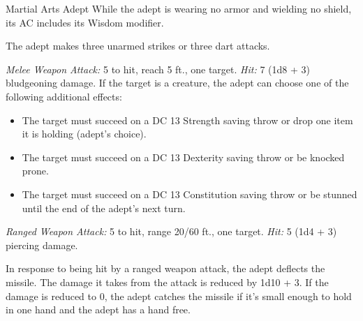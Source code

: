\documentclass[10pt,a4paper,twoside,bg=print,twocolumn,openany,nodeprecatedcode]{dndbook}
\begin{document}
\begin{DndMonster}[float=t]{Martial Arts Adept}
\DndMonsterBasics[
armor-class = {16},
hit-points = {\DndDice{11d8 + 11}},
speed = {40 ft.}
]
\DndMonsterAbilityScores[
 str = 11,
 dex = 17,
 con = 13,
 int = 11,
 wis = 16,
 cha = 10
]
\DndMonsterDetails[
skills = {Acrobatics +5, Insight +5, Stealth +5},
languages = {any one language (usually Common)},
challenge = 3,
]
While the adept is wearing no armor and wielding no shield, its AC includes its Wisdom modifier.

The adept makes three unarmed strikes or three dart attacks.

\textsl{Melee Weapon Attack:} 5 to hit, reach 5 ft., one target. \textsl{Hit:} 7 (1d8 + 3) bludgeoning damage. If the target is a creature, the adept can choose one of the following additional effects:


\begin{itemize}
\item The target must succeed on a DC 13 Strength saving throw or drop one item it is holding (adept's choice).
\item The target must succeed on a DC 13 Dexterity saving throw or be knocked prone.
\item The target must succeed on a DC 13 Constitution saving throw or be stunned until the end of the adept's next turn.
\end{itemize}

\textsl{Ranged Weapon Attack:} 5 to hit, range 20/60 ft., one target. \textsl{Hit:} 5 (1d4 + 3) piercing damage.

In response to being hit by a ranged weapon attack, the adept deflects the missile. The damage it takes from the attack is reduced by 1d10 + 3. If the damage is reduced to 0, the adept catches the missile if it's small enough to hold in one hand and the adept has a hand free.

\end{DndMonster}
\end{document}
